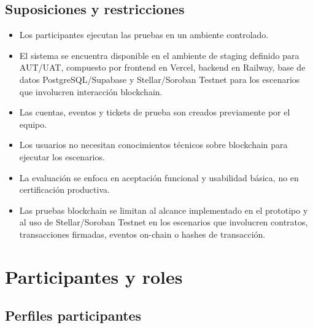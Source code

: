 \documentclass[12pt,letterpaper]{article}
\begin{document}
\subsection{Suposiciones y restricciones}

\begin{itemize}[leftmargin=*]
    \item Los participantes ejecutan las pruebas en un ambiente controlado.
    \item El sistema se encuentra disponible en el ambiente de staging definido para AUT/UAT, compuesto por frontend en Vercel, backend en Railway, base de datos PostgreSQL/Supabase y Stellar/Soroban Testnet para los escenarios que involucren interacción blockchain.
    \item Las cuentas, eventos y tickets de prueba son creados previamente por el equipo.
    \item Los usuarios no necesitan conocimientos técnicos sobre blockchain para ejecutar los escenarios.
    \item La evaluación se enfoca en aceptación funcional y usabilidad básica, no en certificación productiva.
    \item Las pruebas blockchain se limitan al alcance implementado en el prototipo y al uso de Stellar/Soroban Testnet en los escenarios que involucren contratos, transacciones firmadas, eventos on-chain o hashes de transacción.
    \end{itemize}

\section{Participantes y roles}

\subsection{Perfiles participantes}
\end{document}
